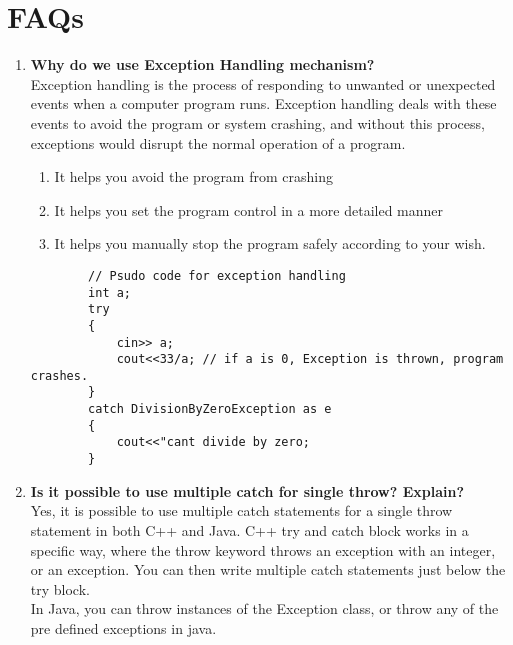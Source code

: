 \documentclass[11pt]{article}
\begin{document}
\section{FAQs}

\begin{enumerate}
	\item \textbf{Why do we use Exception Handling mechanism?}\\
	      Exception handling is the process of responding to unwanted or unexpected events when a computer program runs. Exception handling deals with these events to avoid the program or system crashing, and without this process, exceptions would disrupt the normal operation of a program.
	      \begin{enumerate}
		      \item It helps you avoid the program from crashing
		      \item It helps you set the program control in a more detailed manner
		      \item It helps you manually stop the program safely according to your wish.
	      \end{enumerate}
	      \begin{verbatim}
		// Psudo code for exception handling
		int a;
		try
		{
			cin>> a;
			cout<<33/a; // if a is 0, Exception is thrown, program crashes. 
		}
		catch DivisionByZeroException as e
		{
			cout<<"cant divide by zero;
		}
	\end{verbatim}
	\item \textbf{Is it possible to use multiple catch for single throw? Explain?}\\
	      Yes, it is possible to use multiple catch statements for a single throw statement in both C++ and Java. C++ try and catch block works in a specific way, where the throw keyword throws an exception with an integer, or an exception. You can then write multiple catch statements just below the try block.\\
	      In Java, you can throw instances of the Exception class, or throw any of the pre defined exceptions in java.


\end{enumerate}
\end{document}
